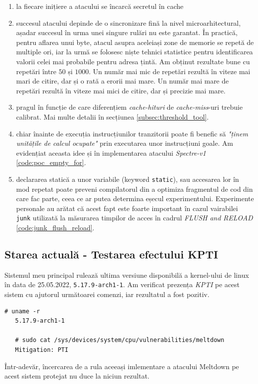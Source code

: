 \begin{enumerate} \item la fiecare inițiere a atacului se încarcă secretul în cache

   \item succesul atacului depinde de o sincronizare fină la nivel
      microarhitectural, așadar succesul în urma unei singure rulări nu este garantat.
      În practică, pentru aflarea unui byte, atacul asupra aceleiași
      zone de memorie se repetă de multiple ori, iar la urmă se folosesc niște
      tehnici statistice pentru identificarea valorii celei mai probabile
      pentru adresa țintă. Am obținut rezultate bune cu repetări între
      $50$ și $1000$. Un număr mai mic de repetări rezultă în viteze mai mari
      de citire, dar și o rată a erorii mai mare. Un număr mai mare de repetări
      rezultă în viteze mai mici de citire, dar și precizie mai mare.

   \item pragul în funcție de care diferențiem \emph{cache-hituri} de
      \emph{cache-miss}-uri trebuie calibrat. Mai multe detalii în
      secțiunea \ref{subsec:threshold_tool}.

   \item chiar înainte de execuția instrucțiunilor tranzitorii poate fi benefic
      să \emph{"ținem unitățile de calcul ocupate"} prin executarea unor
      instrucțiuni goale. Am evidențiat aceasta idee și în implementarea 
      atacului \emph{Spectre-v1} \ref{code:poc_empty_for}.

   \item declararea statică a unor variabile (keyword \texttt{static}), sau
      accesarea lor în mod repetat poate preveni compilatorul din a optimiza
      fragmentul de cod din care fac parte, ceea ce ar putea determina eșecul
      experimentului. Experimente personale au arătat că acest fapt este foarte
      important în cazul vairabilei \texttt{junk} utilizată la măsurarea
      timpilor de acces în cadrul \emph{FLUSH and RELOAD}
      \ref{code:junk_flush_reload}.

\end{enumerate}

\subsection{Starea actuală - Testarea efectului KPTI}

Sistemul meu principal rulează ultima versiune disponibilă a kernel-ului de
linux în data de 25.05.2022, \texttt{5.17.9-arch1-1}. Am verificat prezența
\emph{KPTI} pe acest sistem cu ajutorul următoarei comenzi,
iar rezultatul a fost pozitiv. 

\begin{lstlisting}[caption=Versiune Kernel și Verifcare prezență KPTI]
   # uname -r
   5.17.9-arch1-1

   # sudo cat /sys/devices/system/cpu/vulnerabilities/meltdown
   Mitigation: PTI
\end{lstlisting}

Într-adevăr, încercarea de a rula aceeași imlementare a atacului Meltdown
pe acest sistem protejat nu duce la niciun rezultat. 
